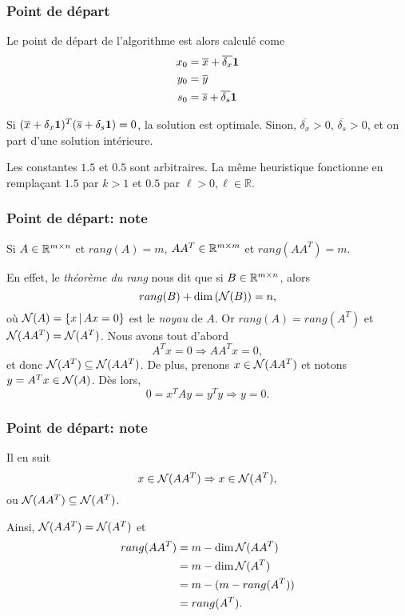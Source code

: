 \documentclass[usepdftitle=false, aspectratio=169]{beamer}
\begin{document}
\begin{frame}
\frametitle{Point de départ}

Le point de départ de l'algorithme est alors calculé come
\begin{align*}
x_0 &= \overline{x} + \overline{\delta_x} {\boldsymbol{1}} \\
y_0 &= \overline{y} \\
s_0 &= \overline{s} + \overline{\delta_s} {\boldsymbol{1}}
\end{align*}

\mbox{}

Si $(\overline{x} + \delta_x {\boldsymbol{1}})^T(\overline{s} + \delta_s {\boldsymbol{1}}) = 0$, la solution est optimale.
Sinon, $\overline{\delta_x} > 0$, $\overline{\delta_s} > 0$, et on part d'une solution intérieure.

\mbox{}

Les constantes $1.5$ et $0.5$ sont arbitraires. La même heuristique fonctionne en remplaçant $1.5$ par $k > 1$ et $0.5$ par $\ell > 0, \ell \in \mathbb{R}$.

\end{frame}

\begin{frame}
\frametitle{Point de départ: note}

Si $A \in {\mathbb{R}}^{m \times n}$ et $rang(A) = m$, $AA^T \in {\mathbb{R}}^{m \times m}$ et $rang(AA^T) = m$.

\mbox{}

En effet, le \textit{théorème du rang} nous dit que si $B \in {\mathbb{R}}^{m \times n}$, alors
$$
rang(B) + \dim \left( {\mathcal{N}}(B) \right) = n,
$$
où ${\mathcal{N}}(A) = \{ x \,|\, Ax = 0 \}$ est le \textit{noyau} de $A$. Or $rang(A) = rang(A^T)$ et ${\mathcal{N}}(AA^T) = {\mathcal{N}}(A^T)$. Nous avons tout d'abord
$$
A^Tx = 0 \Rightarrow AA^Tx = 0,
$$
et donc ${\mathcal{N}}(A^T) \subseteq {\mathcal{N}}(AA^T)$. De plus, prenons $x \in {\mathcal{N}}(AA^T)$ et notons $y = A^Tx \in {\mathcal{N}}(A)$. Dès lors,
$$
0 = x^TAy = y^Ty \Rightarrow y = 0.
$$

\end{frame}

\begin{frame}
\frametitle{Point de départ: note}

Il en suit
$$
x \in {\mathcal{N}}(AA^T) \Rightarrow x \in {\mathcal{N}}(A^T),
$$
ou ${\mathcal{N}}(AA^T) \subseteq {\mathcal{N}}(A^T)$.

\mbox{}

Ainsi, ${\mathcal{N}}(AA^T) = {\mathcal{N}}(A^T)$ et
\begin{align*}
rang(AA^T) &= m - \dim{\mathcal{N}}(AA^T) \\ &= m - \dim{\mathcal{N}}(A^T) \\ &= m - (m - rang(A^T)) \\ & = rang(A^T).
\end{align*}

\end{frame}
\end{document}
